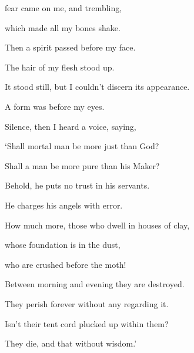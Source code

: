 {\par }{\Q {}fear came on me, and trembling,
\par }{\QB which made all my bones shake.
\par }{\Q {}Then a spirit passed before my face.
\par }{\QB The hair of my flesh stood up.
\par }{\Q {}It stood still, but I couldn’t discern its appearance.
\par }{\QB A form was before my eyes.
\par }{\QB Silence, then I heard a voice, saying,
\par }{\Q {}‘Shall mortal man be more just than God?
\par }{\QB Shall a man be more pure than his Maker?
\par }{\Q {}Behold, he puts no trust in his servants.
\par }{\QB He charges his angels with error.
\par }{\Q {}How much more, those who dwell in houses of clay,
\par }{\QB whose foundation is in the dust,
\par }{\QB who are crushed before the moth!
\par }{\Q {}Between morning and evening they are destroyed.
\par }{\QB They perish forever without any regarding it.
\par }{\Q {}Isn’t their tent cord plucked up within them?
\par }{\QB They die, and that without wisdom.’

}
